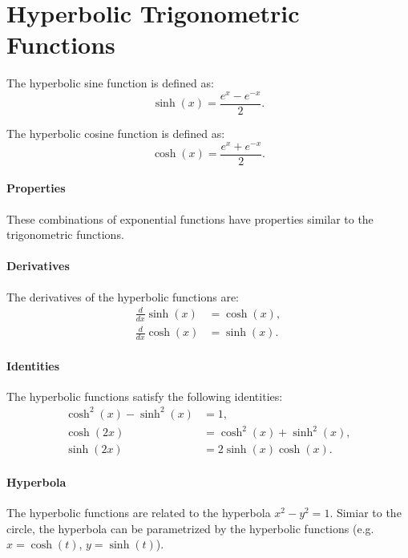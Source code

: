 \documentclass[11pt]{article}
\begin{document}
\section{Hyperbolic Trigonometric Functions}
\begin{definition}
    The hyperbolic sine function is defined as:
    \begin{equation} \sinh(x) = \frac{e^x - e^{-x}}{2}. \end{equation}
\end{definition}
\begin{definition}
    The hyperbolic cosine function is defined as:
    \begin{equation}  \cosh(x) = \frac{e^x + e^{-x}}{2}. \end{equation}
\end{definition}
\paragraph{Properties} These combinations of exponential functions have properties similar to the trigonometric functions.
\paragraph{Derivatives} The derivatives of the hyperbolic functions are:
\begin{align}
    \frac{d}{dx} \sinh(x) &= \cosh(x), \\
    \frac{d}{dx} \cosh(x) &= \sinh(x).
\end{align}
\paragraph{Identities} The hyperbolic functions satisfy the following identities:
\begin{align}
    \cosh^2(x) - \sinh^2(x) &= 1, \\
    \cosh(2x) &= \cosh^2(x) + \sinh^2(x), \\
    \sinh(2x) &= 2\sinh(x)\cosh(x).
\end{align}
\paragraph{Hyperbola} The hyperbolic functions are related to the hyperbola $x^2 - y^2 = 1$. Simiar to the circle, the hyperbola can be parametrized by the hyperbolic functions (e.g. $x = \cosh(t)$, $y = \sinh(t)$).
\end{document}
